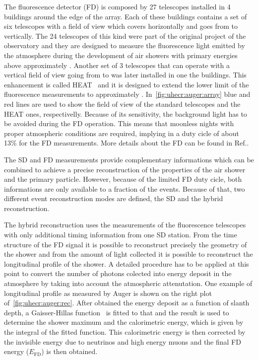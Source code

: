 The fluorescence detector (FD) is composed by 27 telescopes installed in
4 buildings around the edge of the array. Each of these buildings contains
a set of six telescopes with a field of view which covers  horizontally
and goes from  to  vertically. The 24 telescopes of this kind
were part of the original project of the observatory and they are designed to measure
the fluorescence light emitted by the atmosphere during the development of air showers
with primary energies above approximately . Another set of 3 telescopes
that can operate with a vertical field of view going from  to 
was later installed in one the buildings.
This enhancement is called HEAT~\cite{Mathes:2011zz} and it is
designed to extend the lower limit of the fluorescence measurements to approximately .
In~\cref{fig:uhecr:auger:array}
blue and red lines are used to show the field of view of the standard telescopes
and the HEAT ones, respectivelly. Because of its sensitivity, the background light has to be avoided
during the FD operation. This means that moonless nights with proper atmospheric conditions
are required, implying in a duty cicle of about 13\% for the FD measurements. 
More details about the FD can be found in Ref.\cite{Abraham:2009pm}.

The SD and FD measurements provide complementary informations 
which can be combined to achieve a precise reconstruction of the
properties of the air shower and the primary particle.
However, because of the limited FD duty cicle, both informations
are only available to a fraction of the events. Because of that,
two different event reconstruction modes are defined, the SD and
the hybrid reconstruction.

The hybrid reconstruction uses the measurements of the
fluorescence telescopes with only additional timing information
from one SD station. From the time structure of the FD signal it is
possible to reconstruct precisely the geometry of the shower and
from the amount of light collected it is possible to reconstruct the
longitudinal profile of the shower. A detailed procedure has to be applied
at this point to convert the number of photons colected into energy deposit
in the atmosphere by taking into account the atmospheric attenutation.
One example of longitudinal profile as measured by Auger is shown
on the right plot of~\cref{fig:uhecr:auger:rec}.
After obtained the energy deposit as a function of slanth depth,
a Gaisser-Hillas function~\cite{GaisserHillas1977} is fitted to that and the result
is used to determine the shower maximum \xmax and the calorimetric energy,
which is given by the integral of the fitted function. This calorimetric
energy is then corrected by the invisible energy due to neutrinos and high energy
muons and the final FD energy ($E_\text{FD}$) is then obtained.

